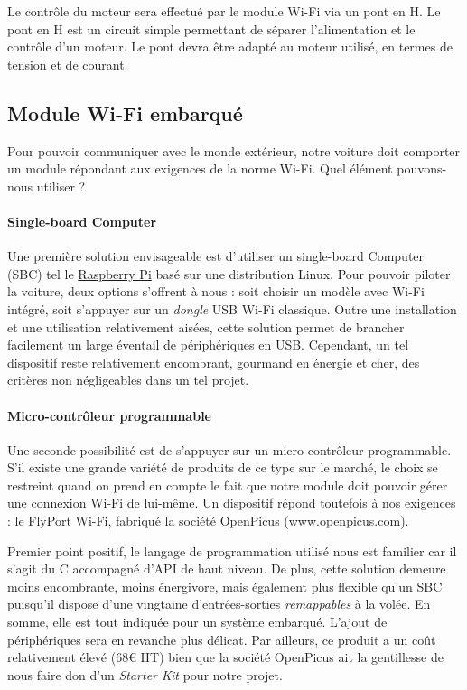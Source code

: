 \documentclass[a4paper,12pt]{report}
\begin{document}
Le contrôle du moteur sera effectué par le module Wi-Fi via un pont en H. Le pont en H est un circuit simple permettant de séparer l'alimentation et le contrôle d'un moteur. Le pont devra être adapté au moteur utilisé, en termes de tension et de courant.

		\subsection{Module Wi-Fi embarqué}
		Pour pouvoir communiquer avec le monde extérieur, notre voiture doit comporter un module répondant aux exigences de la norme Wi-Fi. Quel élément pouvons-nous utiliser ?
			
			\paragraph{Single-board Computer}
			Une première solution envisageable est d’utiliser un single-board Computer (SBC) tel le \href{http://www.raspberrypi.org/}{Raspberry Pi} basé sur une distribution Linux. Pour pouvoir piloter la voiture, deux options s’offrent à nous : soit choisir un modèle avec Wi-Fi intégré, soit s’appuyer sur un \emph{dongle} USB Wi-Fi classique. Outre une installation et une utilisation relativement aisées, cette solution permet de brancher facilement un large éventail de périphériques en USB. Cependant, un tel dispositif reste relativement encombrant, gourmand en énergie et cher, des critères non négligeables dans un tel projet.
		
		\paragraph{Micro-contrôleur programmable}
		Une seconde possibilité est de s’appuyer sur un micro-contrôleur programmable. S’il existe une grande variété de produits de ce type sur le marché, le choix se restreint quand on prend en compte le fait que notre module doit pouvoir gérer une connexion Wi-Fi de lui-même. Un dispositif répond toutefois à nos exigences : le FlyPort Wi-Fi, fabriqué la société OpenPicus (\href{http://www.openpicus.com}{www.openpicus.com}).

Premier point positif, le langage de programmation utilisé nous est familier car il s’agit du C accompagné d'API de haut niveau. De plus, cette solution demeure moins encombrante, moins énergivore, mais également plus flexible qu'un SBC puisqu'il dispose d'une vingtaine d'entrées-sorties \emph{remappables} à la volée. En somme, elle est tout indiquée pour un système embarqué. L’ajout de périphériques sera en revanche plus délicat. Par ailleurs, ce produit a un coût relativement élevé (68€ HT) bien que la société OpenPicus ait la gentillesse de nous faire don d'un \emph{Starter Kit} pour notre projet.
\end{document}
